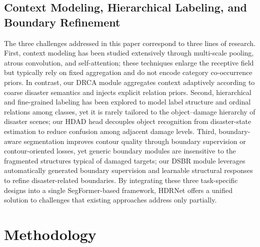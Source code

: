 \documentclass[lettersize,journal]{IEEEtran}
\begin{document}
\subsection{Context Modeling, Hierarchical Labeling, and Boundary Refinement}
The three challenges addressed in this paper correspond to three lines of research. First, context modeling has been studied extensively through multi-scale pooling, atrous convolution, and self-attention; these techniques enlarge the receptive field but typically rely on fixed aggregation and do not encode category co-occurrence priors. In contrast, our DRCA module aggregates context adaptively according to coarse disaster semantics and injects explicit relation priors\cite{maRS3MambaVisualState2024, chenAfaMambaAdaptiveFeature2025, yuanObjectContextualRepresentationsSemantic2020}. 
Second, hierarchical and fine-grained labeling has been explored to model label structure and ordinal relations among classes, yet it is rarely tailored to the object--damage hierarchy of disaster scenes; our HDAD head decouples object recognition from disaster-state estimation to reduce confusion among adjacent damage levels\cite{fuDeepOrdinalRegression2018a, liDeepHierarchicalSemantic2022a, weberFlatteningParentBias2024}. 
Third, boundary-aware segmentation improves contour quality through boundary supervision or contour-oriented losses, yet generic boundary modules are insensitive to the fragmented structures typical of damaged targets; our DSBR module leverages automatically generated boundary supervision and learnable structural responses to refine disaster-related boundaries\cite{kervadecBoundaryLossHighly2021a, takikawaGatedSCNNGatedShape2019a, zhangBoundaryAwareSpatialFrequency2024, yuProbabilityGuidedEdgeEnhancement2025, sunHandlingNoisyAnnotation2025}.
By integrating these three task-specific designs into a single SegFormer-based framework, HDRNet offers a unified solution to challenges that existing approaches address only partially.

\section{Methodology}
\end{document}
